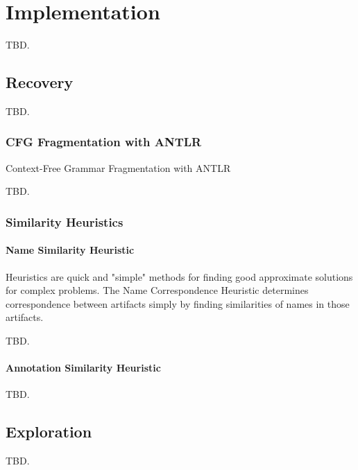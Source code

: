 \chapter{Implementation}
TBD.

\section{Recovery}
TBD.

\subsection{CFG Fragmentation with ANTLR}
Context-Free Grammar Fragmentation with ANTLR

TBD.

\subsection{Similarity Heuristics}

\subsubsection{Name Similarity Heuristic}
Heuristics are quick and "simple" methods for finding good approximate solutions for complex problems.
The Name Correspondence Heuristic determines correspondence between artifacts simply by finding similarities of names in those artifacts. 

TBD.

\subsubsection{Annotation Similarity Heuristic}
TBD.

\section{Exploration}
TBD.